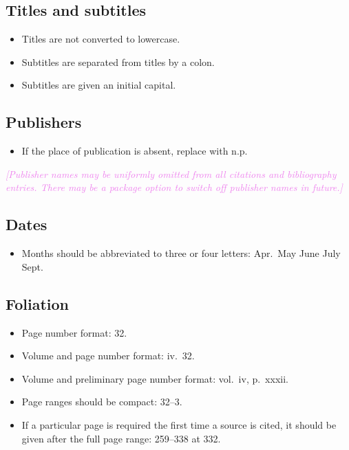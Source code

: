 \documentclass[extrafontsizes,11pt,a4paper,oneside]{memoir}
\newcommand*{\aside}[1]{\textcolor{violet}{\emph{[#1]}}}
\begin{document}
    \subsection{Titles and subtitles}
    
    \begin{itemize}
        \item Titles are not converted to lowercase.
        
        \item Subtitles are separated from titles by a colon.
        
        \item Subtitles are given an initial capital.
        \par{}
    \end{itemize}
    
    \subsection{Publishers}
    
    \begin{itemize}
        \item If the place of publication is absent, replace with n.p.
    \end{itemize}
    
    \aside{Publisher names may be uniformly omitted from all citations and bibliography entries. There may be a package option to switch off publisher names in future.}
    
    \subsection{Dates}
    
    \begin{itemize}
        \item Months should be abbreviated to three or four letters: Apr.\ May June July Sept. %
    \end{itemize}
    
    \subsection{Foliation}
    
    \begin{itemize}
        \item Page number format: 32.
        \item Volume and page number format: iv.\ 32.
        \item Volume and preliminary page number format: vol.\ iv, p.\ xxxii.
        \item Page ranges should be compact: 32--3.\\
        \item If a particular page is required the first time a source is cited, it should be given after the full page range: 259--338 at 332.\\
    \end{itemize}
    
\end{document}

